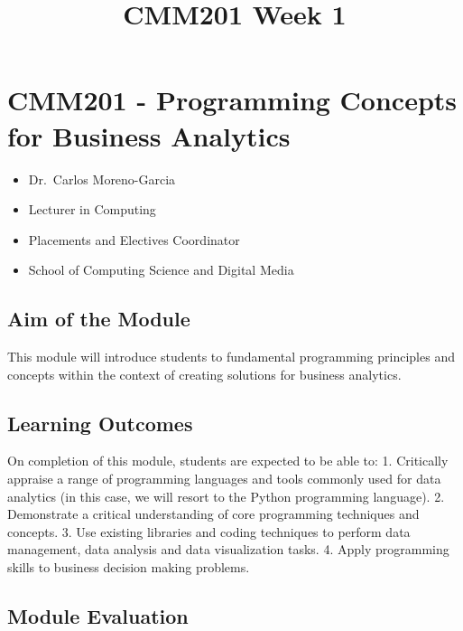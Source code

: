 \documentclass[11pt]{article}
\title{CMM201 Week 1}
\date{}
\providecommand{\tightlist}{%
      \setlength{\itemsep}{0pt}\setlength{\parskip}{0pt}}
\begin{document}
    
    
    \maketitle
    

    \hypertarget{cmm201---programming-concepts-for-business-analytics}{%
\section{CMM201 - Programming Concepts for Business
Analytics}\label{cmm201---programming-concepts-for-business-analytics}}

\begin{itemize}
\tightlist
\item
  Dr.~Carlos Moreno-Garcia
\item
  Lecturer in Computing
\item
  Placements and Electives Coordinator
\item
  School of Computing Science and Digital Media
\end{itemize}

    \hypertarget{aim-of-the-module}{%
\subsection{Aim of the Module}\label{aim-of-the-module}}

This module will introduce students to fundamental programming
principles and concepts within the context of creating solutions for
business analytics.

    \hypertarget{learning-outcomes}{%
\subsection{Learning Outcomes}\label{learning-outcomes}}

On completion of this module, students are expected to be able to: 1.
Critically appraise a range of programming languages and tools commonly
used for data analytics (in this case, we will resort to the Python
programming language). 2. Demonstrate a critical understanding of core
programming techniques and concepts. 3. Use existing libraries and
coding techniques to perform data management, data analysis and data
visualization tasks. 4. Apply programming skills to business decision
making problems.

    \hypertarget{module-evaluation}{%
\subsection{Module Evaluation}\label{module-evaluation}}
\end{document}
